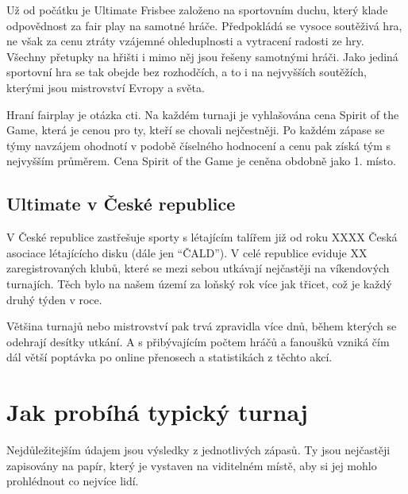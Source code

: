 \documentclass[thesis=B,czech]{FITthesis}[2012/06/26]
\begin{document}
\indent

Už od počátku je Ultimate Frisbee založeno na sportovním duchu, který klade odpovědnost
za fair play na samotné hráče. Předpokládá se vysoce soutěživá hra, ne však za cenu ztráty
vzájemné ohleduplnosti a vytracení radosti ze hry. Všechny přetupky na hřišti i mimo něj jsou
řešeny samotnými hráči. Jako jediná sportovní hra se tak obejde bez rozhodčích, a to i
na nejvyšších soutěžích, kterými jsou mistrovství Evropy a světa.

\medskip

Hraní fairplay je otázka cti. Na každém turnaji je vyhlašována cena Spirit of the Game,
která je cenou pro ty, kteří se chovali nejčestněji. Po každém zápase se týmy navzájem ohodnotí
v podobě číselného hodnocení a cenu pak získá tým s nejvyšším průměrem. Cena Spirit of the Game
je ceněna obdobně jako 1. místo.

\subsection{Ultimate v České republice}

\indent

V České republice zastřešuje sporty s létajícím talířem již od roku XXXX Česká asociace
lé\-ta\-jícícho disku (dále jen ``ČALD''). V celé republice eviduje XX zaregistrovaných klubů,
které se mezi sebou utkávají nejčastěji na víkendových turnajích. Těch bylo na našem
území za loňský rok více jak třicet, což je každý druhý týden v roce.

\medskip

Většina turnajů nebo mistrovství pak trvá zpravidla více dnů, během kterých se odehrají desítky
utkání. A s přibývajícím počtem hráčů a fanoušků vzniká čím dál větší poptávka po online
přenosech a statistikách z těchto akcí.


\section{Jak probíhá typický turnaj}

\indent

Nejdůležitejším údajem jsou výsledky z jednotlivých zápasů. Ty jsou nejčastěji zapisovány
na papír, který je vystaven na viditelném místě, aby si jej mohlo prohlédnout co nejvíce lidí.

\medskip
\end{document}
